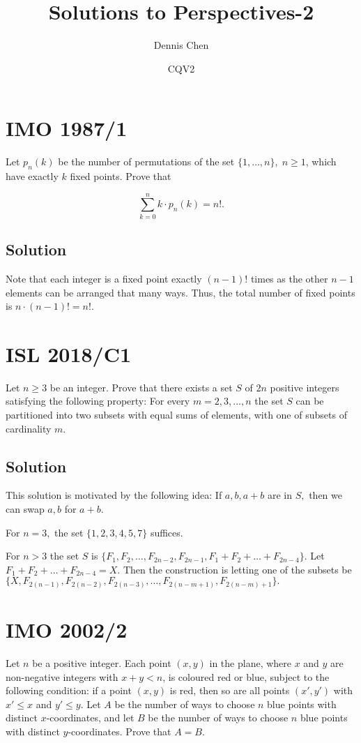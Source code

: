 \documentclass{article}
\title{Solutions to Perspectives-2}
\author{Dennis Chen}
\date{CQV2}
\begin{document}
\maketitle

\toc

\pagebreak\section{IMO 1987/1}

Let $p_n (k)$ be the number of permutations of the set $\{ 1, \ldots , n \} , \; n \ge 1$, which have exactly $k$ fixed points. Prove that

\[\sum_{k=0}^{n} k \cdot p_n (k) = n!.\]

\subsection{Solution}

Note that each integer is a fixed point exactly $(n-1)!$ times as the other $n-1$ elements can be arranged that many ways. Thus, the total number of fixed points is $n\cdot (n-1)!=n!.$

\pagebreak\section{ISL 2018/C1}
Let $n\geq 3$ be an integer. Prove that there exists a set $S$ of $2n$ positive integers satisfying the following property: For every $m=2,3,...,n$ the set $S$ can be partitioned into two subsets with equal sums of elements, with one of subsets of cardinality $m.$

\subsection{Solution}
This solution is motivated by the following idea: If $a,b,a+b$ are in $S,$ then we can swap $a,b$ for $a+b$.

For $n=3,$ the set $\{1,2,3,4,5,7\}$ suffices.

For $n>3$ the set $S$ is $\{F_1,F_2,\ldots,F_{2n-2},F_{2n-1},F_{1}+F_{2}+\ldots+F_{2n-4}\}.$ Let $F_1+F_2+\ldots+F_{2n-4}=X.$ Then the construction is letting one of the subsets be $\{X,F_{2(n-1)},F_{2(n-2)},F_{2(n-3)},\ldots,F_{2(n-m+1)},F_{2(n-m)+1}\}.$

\pagebreak\section{IMO 2002/2}
Let $n$ be a positive integer. Each point $(x,y)$ in the plane, where $x$ and $y$ are non-negative integers with $x+y<n$, is coloured red or blue, subject to the following condition: if a point $(x,y)$ is red, then so are all points $(x',y')$ with $x'\leq x$ and $y'\leq y$. Let $A$ be the number of ways to choose $n$ blue points with distinct $x$-coordinates, and let $B$ be the number of ways to choose $n$ blue points with distinct $y$-coordinates. Prove that $A=B$.
\end{document}
